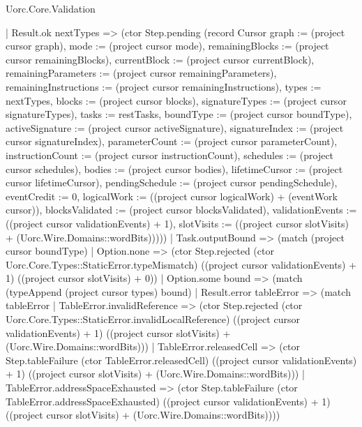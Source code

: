 \begin{lexlean}{Uorc.Core.Validation}
\begin{semanticmodule}
{        | Result.ok nextTypes => (ctor Step.pending (record Cursor {graph := (project cursor graph), mode := (project cursor mode), remainingBlocks := (project cursor remainingBlocks), currentBlock := (project cursor currentBlock), remainingParameters := (project cursor remainingParameters), remainingInstructions := (project cursor remainingInstructions), types := nextTypes, blocks := (project cursor blocks), signatureTypes := (project cursor signatureTypes), tasks := restTasks, boundType := (project cursor boundType), activeSignature := (project cursor activeSignature), signatureIndex := (project cursor signatureIndex), parameterCount := (project cursor parameterCount), instructionCount := (project cursor instructionCount), schedules := (project cursor schedules), bodies := (project cursor bodies), lifetimeCursor := (project cursor lifetimeCursor), pendingSchedule := (project cursor pendingSchedule), eventCredit := 0, logicalWork := ((project cursor logicalWork) + (eventWork cursor)), blocksValidated := (project cursor blocksValidated), validationEvents := ((project cursor validationEvents) + 1), slotVisits := ((project cursor slotVisits) + (Uorc.Wire.Domains::wordBits))})))
      | Task.outputBound => (match (project cursor boundType)
        | Option.none => (ctor Step.rejected (ctor Uorc.Core.Types::StaticError.typeMismatch) ((project cursor validationEvents) + 1) ((project cursor slotVisits) + 0))
        | Option.some bound => (match (typeAppend (project cursor types) bound)
          | Result.error tableError => (match tableError
            | TableError.invalidReference => (ctor Step.rejected (ctor Uorc.Core.Types::StaticError.invalidLocalReference) ((project cursor validationEvents) + 1) ((project cursor slotVisits) + (Uorc.Wire.Domains::wordBits)))
            | TableError.releasedCell => (ctor Step.tableFailure (ctor TableError.releasedCell) ((project cursor validationEvents) + 1) ((project cursor slotVisits) + (Uorc.Wire.Domains::wordBits)))
            | TableError.addressSpaceExhausted => (ctor Step.tableFailure (ctor TableError.addressSpaceExhausted) ((project cursor validationEvents) + 1) ((project cursor slotVisits) + (Uorc.Wire.Domains::wordBits))))
}
\end{semanticmodule}
\end{lexlean}
